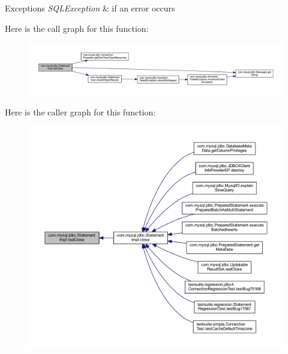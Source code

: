\begin{DoxyExceptions}{Exceptions}
{\em S\+Q\+L\+Exception} & if an error occurs \\
\hline
\end{DoxyExceptions}
Here is the call graph for this function\+:
\nopagebreak
\begin{figure}[H]
\begin{center}
\leavevmode
\includegraphics[width=350pt]{classcom_1_1mysql_1_1jdbc_1_1_statement_impl_a1e0670e4c9378bf2790c688208dc8913_cgraph}
\end{center}
\end{figure}
Here is the caller graph for this function\+:
\nopagebreak
\begin{figure}[H]
\begin{center}
\leavevmode
\includegraphics[width=350pt]{classcom_1_1mysql_1_1jdbc_1_1_statement_impl_a1e0670e4c9378bf2790c688208dc8913_icgraph}
\end{center}
\end{figure}
\mbox{\label{classcom_1_1mysql_1_1jdbc_1_1_statement_impl_ab4429663e878a0b4b52445a95761b37d}} 
